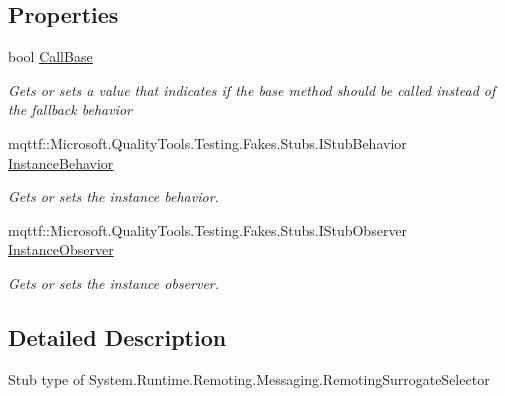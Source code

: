 \subsection*{Properties}
\begin{DoxyCompactItemize}
\item 
bool \hyperlink{class_system_1_1_runtime_1_1_remoting_1_1_messaging_1_1_fakes_1_1_stub_remoting_surrogate_selector_ad55dccf2d0a4185c66c59a1b2ccb3015}{Call\-Base}
\begin{DoxyCompactList}\small\item\em Gets or sets a value that indicates if the base method should be called instead of the fallback behavior\end{DoxyCompactList}\item 
mqttf\-::\-Microsoft.\-Quality\-Tools.\-Testing.\-Fakes.\-Stubs.\-I\-Stub\-Behavior \hyperlink{class_system_1_1_runtime_1_1_remoting_1_1_messaging_1_1_fakes_1_1_stub_remoting_surrogate_selector_ab32437565a16ba6e28787c1df7a73b32}{Instance\-Behavior}
\begin{DoxyCompactList}\small\item\em Gets or sets the instance behavior.\end{DoxyCompactList}\item 
mqttf\-::\-Microsoft.\-Quality\-Tools.\-Testing.\-Fakes.\-Stubs.\-I\-Stub\-Observer \hyperlink{class_system_1_1_runtime_1_1_remoting_1_1_messaging_1_1_fakes_1_1_stub_remoting_surrogate_selector_a14db56db4528346b8fe7e03ad6c79b78}{Instance\-Observer}
\begin{DoxyCompactList}\small\item\em Gets or sets the instance observer.\end{DoxyCompactList}\end{DoxyCompactItemize}


\subsection{Detailed Description}
Stub type of System.\-Runtime.\-Remoting.\-Messaging.\-Remoting\-Surrogate\-Selector



